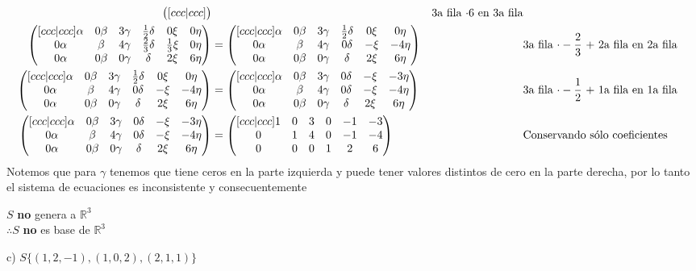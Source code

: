 \documentclass[letterpaper]{article}
\newcommand{\R}{\mathds{R}}
\renewcommand{\*}{\cdot}
\theoremstyle{definition}
\begin{document}
\begin{align*}
\begin{pmatrix}[ccc|ccc]
			\end{pmatrix} && \text{3a fila $ \* 6 $ en 3a fila}\\
			 \begin{pmatrix}[ccc|ccc]
			 \alpha & 0\beta & 3\gamma & \frac{1}{2}\delta & 0\xi & 0\eta\\
			 0\alpha & \beta & 4\gamma& \frac{2}{3}\delta & \frac{1}{3}\xi & 0\eta\\
			 0\alpha & 0\beta & 0\gamma & \delta & 2\xi & 6\eta
			 \end{pmatrix} & =  \begin{pmatrix}[ccc|ccc]
			 \alpha & 0\beta & 3\gamma & \frac{1}{2}\delta & 0\xi & 0\eta\\
			 0\alpha & \beta & 4\gamma& 0\delta & -\xi & -4\eta\\
			 0\alpha & 0\beta & 0\gamma & \delta & 2\xi & 6\eta
			 \end{pmatrix} && \text{3a fila $ \* -\dfrac{2}{3} $ + 2a fila en 2a fila}\\\begin{pmatrix}[ccc|ccc]
			 \alpha & 0\beta & 3\gamma & \frac{1}{2}\delta & 0\xi & 0\eta\\
			 0\alpha & \beta & 4\gamma& 0\delta & -\xi & -4\eta\\
			 0\alpha & 0\beta & 0\gamma & \delta & 2\xi & 6\eta
			 \end{pmatrix} & = \begin{pmatrix}[ccc|ccc]
			 \alpha & 0\beta & 3\gamma & 0\delta & -\xi & -3\eta\\
			 0\alpha & \beta & 4\gamma& 0\delta & -\xi & -4\eta\\
			 0\alpha & 0\beta & 0\gamma & \delta & 2\xi & 6\eta
			 \end{pmatrix} && \text{3a fila $ \* -\dfrac{1}{2} $ + 1a fila en 1a fila}\\
			 \begin{pmatrix}[ccc|ccc]
			 \alpha & 0\beta & 3\gamma & 0\delta & -\xi & -3\eta\\
			 0\alpha & \beta & 4\gamma& 0\delta & -\xi & -4\eta\\
			 0\alpha & 0\beta & 0\gamma & \delta & 2\xi & 6\eta
			 \end{pmatrix} & = \begin{pmatrix}[ccc|ccc]
			 1 & 0 & 3 & 0 & -1 & -3\\
			 0 & 1 & 4& 0 & -1 & -4\\
			 0 & 0 & 0 & 1 & 2 & 6
			 \end{pmatrix} && \text{Conservando sólo coeficientes }
		\end{align*}
		Notemos que para $ \gamma $ tenemos que tiene ceros en la parte izquierda y puede tener valores distintos de cero en la parte derecha, por lo tanto el sistema de ecuaciones es inconsistente y consecuentemente 
		\begin{center}
			$ S $ \textbf{no} genera a $ \R^3 $\\
			$\therefore S $ \textbf{no} es base de $ \R^3 $\\
		\end{center}
	c) $S \lbrace (1,2,-1),(1,0,2),(2,1,1) \rbrace$\\
	
\end{document}
